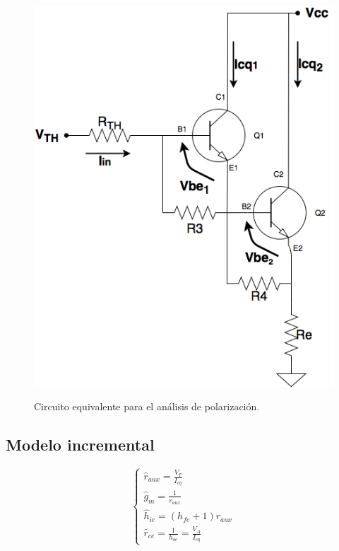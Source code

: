		\begin{figure}[H]
			\centering
			\includegraphics[scale=0.4]{../polarizacion.png} \\
			\caption{Circuito equivalente para el an\'alisis de polarizaci\'on.}
			\label{polarizacion}
		\end{figure}

	\subsection{Modelo incremental}
	
		\begin{equation}
			\begin{cases}
			\widehat{r}_{aux} = \frac{V_T}{I_{cq}}\\
			\widehat{g}_m = \frac{1}{r_{aux}}\\	
			\widehat{h}_{ie} = (h_{fe} + 1) r_{aux}\\
			\widehat{r}_{ce} = \frac{1}{h_{oe}} = \frac{V_A}{I_{cq}}
			\end{cases}
			\label{mod_inc_ecs}
		\end{equation}
	

